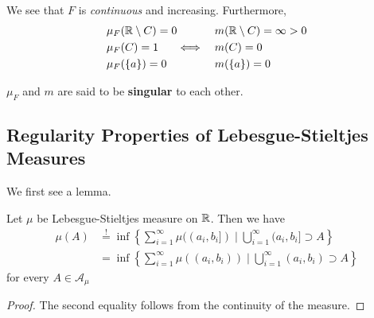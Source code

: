 We see that \(F\) is \emph{continuous} and increasing. Furthermore,
\[
	\begin{alignedat}{3}
		&\mu _F(\mathbb{\MakeUppercase{r}} \setminus C) = 0 &\qquad &m(\mathbb{\MakeUppercase{r}} \setminus C)=\infty >0\\
		&\mu _F(C) = 1 & \iff\quad &m(C) = 0\\
		&\mu _F(\{a\}) = 0 & &m(\{a\})=0
	\end{alignedat}
\]
\begin{remark}
	\(\mu _F\) and \(m\) are said to be \textbf{singular} to each other.
\end{remark}

\subsection{Regularity Properties of Lebesgue-Stieltjes Measures}
We first see a lemma.
\begin{lemma}
	Let \(\mu\) be Lebesgue-Stieltjes measure on \(\mathbb{\MakeUppercase{r}} \). Then we have
	\[
		\begin{split}
			\mu (A) &\overset{\hyperref[prop:outer-measure]{!}}{=}\inf\left\{\sum\limits_{i=1}^{\infty} \mu ((a_{i}, b_{i}]) \mid \bigcup\limits_{i=1}^{\infty} (a_{i}, b_{i}]\supset A\right\}\\
			&= \inf\left\{\sum\limits_{i=1}^{\infty} \mu ((a_{i}, b_{i})) \mid \bigcup\limits_{i=1}^{\infty} (a_{i}, b_{i})\supset A\right\}
		\end{split}
	\]
	for every \(A\in \mathcal{A} _\mu \)
\end{lemma}
\begin{proof}
	The second equality follows from the continuity of the measure.
\end{proof}
